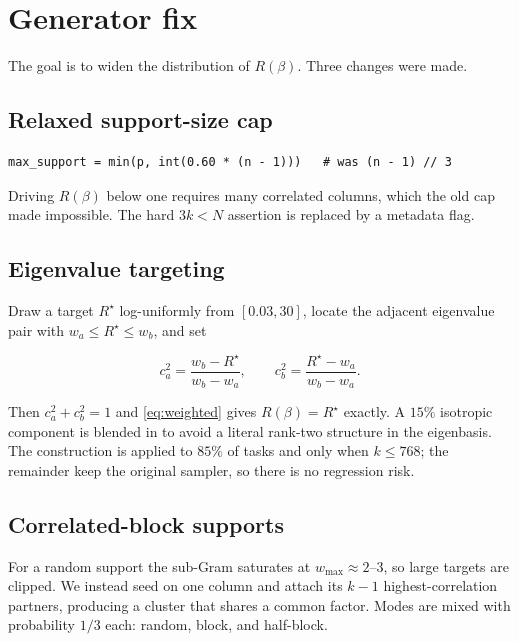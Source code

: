 \documentclass[11pt]{article}
\newcommand{\Rq}{R(\beta)}
\begin{document}
\section{Generator fix}

The goal is to widen the distribution of $\Rq$. Three changes were made.

\subsection{Relaxed support-size cap}

\begin{verbatim}
max_support = min(p, int(0.60 * (n - 1)))   # was (n - 1) // 3
\end{verbatim}

Driving $\Rq$ below one requires many correlated columns, which the old cap
made impossible. The hard $3k < N$ assertion is replaced by a metadata flag.

\subsection{Eigenvalue targeting}

Draw a target $R^\star$ log-uniformly from $[0.03, 30]$, locate the adjacent
eigenvalue pair with $w_a \le R^\star \le w_b$, and set

\begin{equation}
c_a^2 = \frac{w_b - R^\star}{w_b - w_a},
\qquad
c_b^2 = \frac{R^\star - w_a}{w_b - w_a} .
\end{equation}

Then $c_a^2 + c_b^2 = 1$ and \eqref{eq:weighted} gives $\Rq = R^\star$
exactly. A $15\%$ isotropic component is blended in to avoid a literal
rank-two structure in the eigenbasis. The construction is applied to $85\%$
of tasks and only when $k \le 768$; the remainder keep the original sampler,
so there is no regression risk.

\subsection{Correlated-block supports}

For a random support the sub-Gram saturates at $w_{\max} \approx 2$--$3$, so
large targets are clipped. We instead seed on one column and attach its
$k-1$ highest-correlation partners, producing a cluster that shares a common
factor. Modes are mixed with probability $1/3$ each: random, block, and
half-block.
\end{document}
